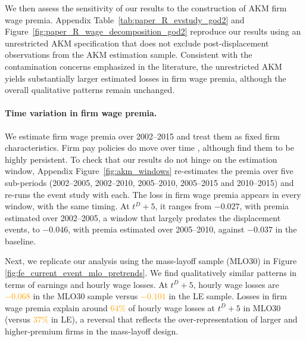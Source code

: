 We then assess the sensitivity of our results to the construction of AKM firm wage premia. Appendix Table~\ref{tab:paper_R_evstudy_god2} and Figure~\ref{fig:paper_R_wage_decomposition_god2} reproduce our results using an unrestricted AKM specification that does not exclude post-displacement observations from the AKM estimation sample. Consistent with the contamination concerns emphasized in the literature, the unrestricted AKM yields substantially larger estimated losses in firm wage premia, although the overall qualitative patterns remain unchanged.

\paragraph{Time variation in firm wage premia.} We estimate firm wage premia over 2002--2015 and treat them as fixed firm characteristics. Firm pay policies do move over time \citep{lachowska2023drift,engbom2023firmpay}, although \citet{lachowska2023drift} find them to be highly persistent. To check that our results do not hinge on the estimation window, Appendix Figure~\ref{fig:akm_windows} re-estimates the premia over five sub-periods (2002--2005, 2002--2010, 2005--2010, 2005--2015 and 2010--2015) and re-runs the event study with each. The loss in firm wage premia appears in every window, with the same timing. At $t^D+5$, it ranges from $-0.027$, with premia estimated over 2002--2005, a window that largely predates the displacement events, to $-0.046$, with premia estimated over 2005--2010, against $-0.037$ in the baseline.

Next, we replicate our analysis using the mass-layoff sample (MLO30) in Figure \ref{fig:fe_current_event_mlo_pretrends}. We find qualitatively similar patterns in terms of earnings and hourly wage losses. At \(t^D+5\), hourly wage losses are \textcolor{orange}{\(-0.068\)} in the MLO30 sample versus \textcolor{orange}{\(-0.101\)} in the LE sample. Losses in firm wage premia explain around \textcolor{orange}{\(64\%\)} of hourly wage losses at \(t^D+5\) in MLO30 (versus \textcolor{orange}{\(37\%\)} in LE), a reversal that reflects the over-representation of larger and higher-premium firms in the mass-layoff design. %


